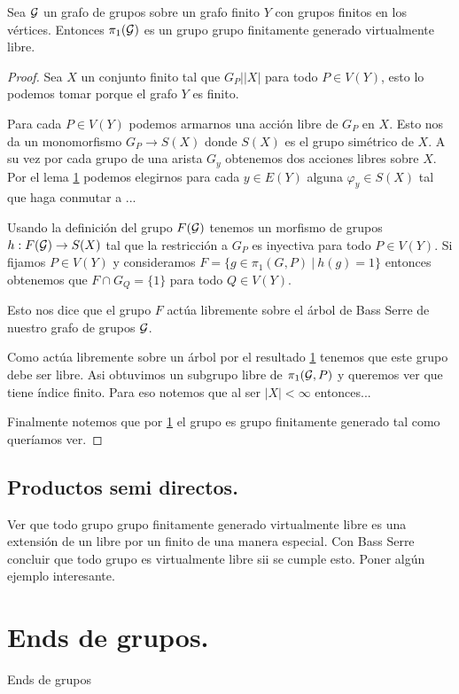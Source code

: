 \documentclass[tesis.tex]{subfiles}
\newcommand{\fg}{grupo finitamente generado }
\newcommand{\cG}{ {\cal G} }
\begin{document}
\begin{teo}
	Sea $\cal G$ un grafo de grupos sobre un grafo finito $Y$ con grupos finitos en los vértices.
	Entonces $\pi_1(\cal G)$ es un grupo \fg virtualmente libre.
\end{teo}
\begin{proof}
	Sea $X$ un conjunto finito tal que $G_P | |X|$ para todo $P \in V(Y)$, esto lo podemos tomar porque el grafo $Y$ es finito.
	
	
	Para cada $P \in V(Y)$ podemos armarnos una acción libre de $G_P$ en $X$. 
	Esto nos da un monomorfismo $G_P \to S(X)$ donde $S(X)$ es el grupo simétrico de $X$.
	A su vez por cada grupo de una arista $G_y$ obtenemos dos acciones libres sobre $X$.
	Por el lema \ref{} podemos elegirnos para cada $y \in E(Y)$ alguna $\varphi_y \in S(X)$ tal que haga conmutar a ...
	
	
	Usando la definición del grupo $F(\cG)$ tenemos un morfismo de grupos $h: F(\cG) \to S(X)$ tal que la restricción a $G_P$ es inyectiva para todo $P \in V(Y)$.
	Si fijamos $P \in V(Y)$ y consideramos $F = \{  g \in \pi_1(G,P) \ | \ h(g) = 1  \}$  entonces obtenemos que $F \cap G_Q = \{ 1 \}$ para todo $Q \in V(Y)$.
	
	Esto nos dice que el grupo $F$ actúa libremente sobre el árbol de Bass Serre de nuestro grafo de grupos $\cG$.
	
	Como actúa libremente sobre un árbol por el resultado \ref{} tenemos que este grupo debe ser libre. 
	Asi obtuvimos un subgrupo libre de $\pi_1(\cG, P)$ y queremos ver que tiene índice finito.
	Para eso notemos que al ser $|X| < \infty$ entonces...
	
	Finalmente notemos que por \ref{} el grupo es \fg tal como queríamos ver.
\end{proof}

\subsection{Productos semi directos.}

Ver que todo grupo \fg virtualmente libre es una extensión de un libre por un finito de una manera especial.
Con Bass Serre concluir que todo grupo es virtualmente libre sii se cumple esto.
Poner algún ejemplo interesante.

\section{Ends de grupos.}

\begin{deff}
	Ends de grupos
\end{deff}
\end{document}
